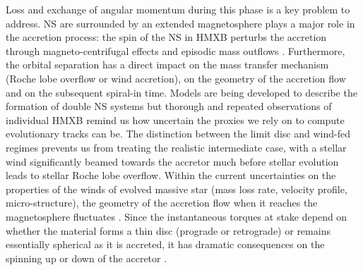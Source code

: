 \documentclass[letterpaper,12pt,onecolumn]{article}
\makeatletter
\newcommand*{\hmxb}{HMXB\@\xspace}
\newcommand*{\ns}{NS\@\xspace}
\makeatother
\begin{document}


Loss and exchange of angular momentum during this phase is a key problem to address. \ns are surrounded by an extended magnetosphere plays a major role in the accretion process: the spin of the \ns in \hmxb perturbs the accretion through magneto-centrifugal effects and episodic mass outflows \citep{Bozzo2008}. Furthermore, the orbital separation has a direct impact on the mass transfer mechanism (Roche lobe overflow or wind accretion), on the geometry of the accretion flow and on the subsequent spiral-in time. Models are being developed to describe the formation of double \ns systems \citep{Tauris2017} but thorough and repeated observations of individual \hmxb remind us how uncertain the proxies we rely on to compute evolutionary tracks can be. The distinction between the limit disc and wind-fed regimes prevents us from treating the realistic intermediate case, with a stellar wind significantly beamed towards the accretor much before stellar evolution leads to stellar Roche lobe overflow. Within the current uncertainties on the properties of the winds of evolved massive star (mass loss rate, velocity profile, micro-structure), the geometry of the accretion flow when it reaches the magnetosphere fluctuates \citep{ElMellah2018}. Since the instantaneous torques at stake depend on whether the material forms a thin disc (prograde or retrograde) or remains essentially spherical as it is accreted, it has dramatic consequences on the spinning up or down of the accretor \citep{Ghosh1978,Shakura2012}. 
\end{document}
